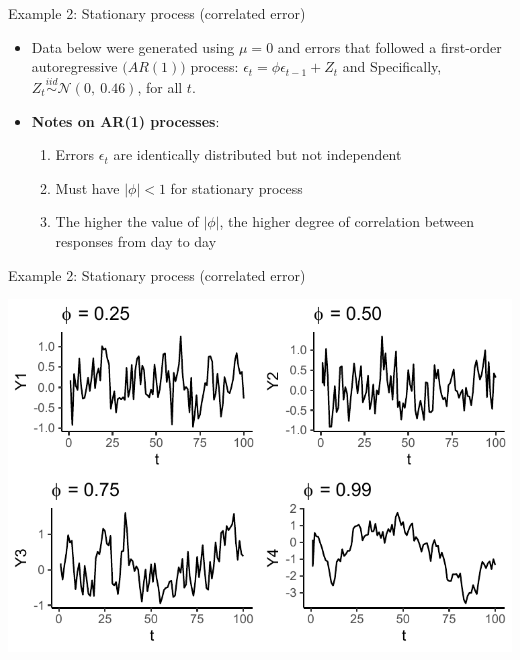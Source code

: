 \documentclass[
  9pt,
  ignorenonframetext,
]{beamer}
\begin{document}
\begin{frame}{}
\protect\hypertarget{section}{}
\begin{block}{Example 2: Stationary process (correlated error)}
\protect\hypertarget{example-2-stationary-process-correlated-error}{}
\begin{itemize}
\item
  Data below were generated using \(\mu=0\) and errors that followed a
  first-order autoregressive \(\big(AR(1)\big)\) process:
  \(\epsilon_t = \phi\epsilon_{t-1} + Z_t\) and Specifically,
  \(Z_t \stackrel {iid} \sim \mathcal {N} (0,\ 0.46)\), for all \(t\).
\item
  \textbf{Notes on AR(1) processes}:

  \begin{enumerate}
  \item
    Errors \(\epsilon_t\) are identically distributed but not
    independent
  \item
    Must have \(|\phi| < 1\) for stationary process
  \item
    The higher the value of \(|\phi|\), the higher degree of correlation
    between responses from day to day
  \end{enumerate}
\end{itemize}
\end{block}
\end{frame}

\begin{frame}{}
\protect\hypertarget{section-1}{}
\begin{block}{Example 2: Stationary process (correlated error)}
\protect\hypertarget{example-2-stationary-process-correlated-error-1}{}
\begin{center}\includegraphics[width=0.9\linewidth]{figs_L1/AR1-1} \end{center}
\end{block}
\end{frame}
\end{document}
